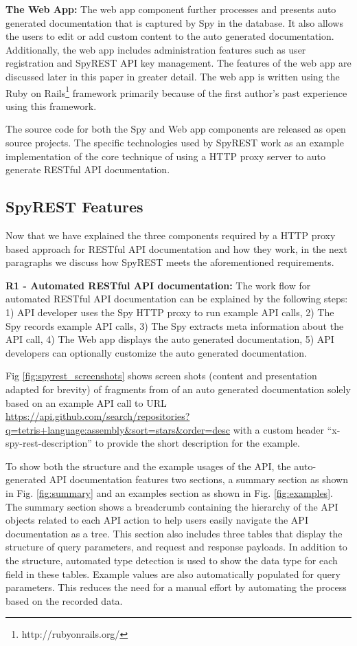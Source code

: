 \documentclass[conference]{IEEEtran}
\begin{document}
\textbf{The Web App:} The web app component further processes and presents auto generated documentation that is captured by Spy in the database. It also allows the users to edit or add custom content to the auto generated documentation. Additionally, the web app includes administration features such as user registration and SpyREST API key management. The features of the web app are discussed later in this paper in greater detail. The web app is written using the Ruby on Rails\footnote{http://rubyonrails.org/} framework primarily because of the first author's past experience using this framework.

The source code for both the Spy and Web app components are released as open source projects. The specific technologies used by SpyREST work as an example implementation of the core technique of using a HTTP proxy server to auto generate RESTful API documentation.

\subsection{SpyREST Features} %

Now that we have explained the three components required by a HTTP proxy based approach for RESTful API documentation and how they work, in the next paragraphs we discuss how SpyREST meets the aforementioned requirements.

\textbf{R1 - Automated RESTful API documentation:} The work flow for automated RESTful API documentation can be explained by the following steps: 1) API developer uses the Spy HTTP proxy to run example API calls, 2) The Spy records example API calls, 3) The Spy extracts meta information about the API call, 4) The Web app displays the auto generated documentation, 5) API developers can optionally customize the auto generated documentation.

Fig \ref{fig:spyrest_screenshots} shows screen shots  (content and presentation adapted for brevity) of fragments from of an auto generated documentation solely based on an example API call to URL \url{https://api.github.com/search/repositories?q=tetris+language:assembly&sort=stars&order=desc} with a custom header ``x-spy-rest-description'' to provide the short description for the example.

To show both the structure and the example usages of the API, the auto-generated API documentation features two sections, a summary section as shown in Fig. \ref{fig:summary} and an examples section as shown in Fig. \ref{fig:examples}. The summary section shows a breadcrumb containing the hierarchy of the API objects related to each API action to help users easily navigate the API documentation as a tree. This section also includes three tables that display the structure of query parameters, and request and response payloads. In addition to the structure, automated type detection is used to show the data type for each field in these tables. Example values are also automatically populated for query parameters. This reduces the need for a manual effort by automating the process based on the recorded data.
\end{document}
